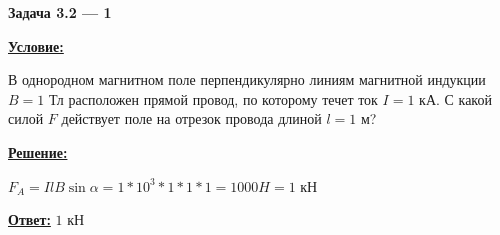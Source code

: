 
\begin{center}
    \textbf{Задача 3.2 --- 1}
\end{center}

\underline{\textbf{Условие:}}

В однородном магнитном поле перпендикулярно линиям магнитной индукции 
$ B = 1 $ Тл расположен прямой провод, по которому течет ток 
$ I = 1 $ кА. 
С какой силой $ F $ действует поле на отрезок провода длиной $ l = 1 $ м?

\underline{\textbf{Решение:}}

$ F_A = IlB\sin{\alpha} =
1 * 10^3 * 1 * 1 * 1 = 
1000 H =
1 $ кН 

\underline{\textbf{Ответ:}}
$ 1 $ кН
